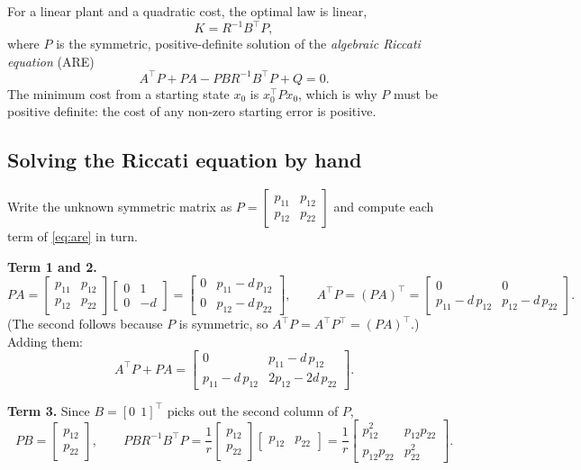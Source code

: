 \documentclass[11pt,a4paper]{article}
\theoremstyle{definition}
\begin{document}
For a linear plant and a quadratic cost, the optimal law is linear,
\begin{equation}
K = R^{-1}B^{\!\top}P,
\label{eq:kformula}
\end{equation}
where $P$ is the symmetric, positive-definite solution of the
\emph{algebraic Riccati equation} (ARE)
\begin{equation}
A^{\!\top} P + P A - P B R^{-1} B^{\!\top} P + Q = 0 .
\label{eq:are}
\end{equation}
The minimum cost from a starting state $x_0$ is $x_0^{\!\top} P x_0$,
which is why $P$ must be positive definite: the cost of any non-zero
starting error is positive.

\subsection{Solving the Riccati equation by hand}

Write the unknown symmetric matrix as
$P = \begin{bmatrix} p_{11} & p_{12}\\ p_{12} & p_{22}\end{bmatrix}$
and compute each term of \eqref{eq:are} in turn.

\textbf{Term 1 and 2.}
\[
PA = \begin{bmatrix} p_{11} & p_{12}\\ p_{12} & p_{22}\end{bmatrix}
     \begin{bmatrix} 0 & 1\\ 0 & -d\end{bmatrix}
   = \begin{bmatrix} 0 & p_{11} - d\,p_{12}\\ 0 & p_{12} - d\,p_{22}\end{bmatrix},
\qquad
A^{\!\top}P = (PA)^{\!\top}
   = \begin{bmatrix} 0 & 0\\ p_{11} - d\,p_{12} & p_{12} - d\,p_{22}\end{bmatrix}.
\]
(The second follows because $P$ is symmetric, so
$A^{\!\top}P = A^{\!\top}P^{\!\top} = (PA)^{\!\top}$.) Adding them:
\[
A^{\!\top}P + PA =
\begin{bmatrix} 0 & p_{11} - d\,p_{12}\\ p_{11} - d\,p_{12} & 2p_{12} - 2d\,p_{22}\end{bmatrix}.
\]

\textbf{Term 3.} Since $B = [0\;\,1]^{\!\top}$ picks out the second
column of $P$,
\[
PB = \begin{bmatrix} p_{12}\\ p_{22}\end{bmatrix},
\qquad
PBR^{-1}B^{\!\top}P = \frac{1}{r}\begin{bmatrix} p_{12}\\ p_{22}\end{bmatrix}
\begin{bmatrix} p_{12} & p_{22}\end{bmatrix}
= \frac{1}{r}\begin{bmatrix} p_{12}^2 & p_{12}p_{22}\\ p_{12}p_{22} & p_{22}^2\end{bmatrix}.
\]
\end{document}
